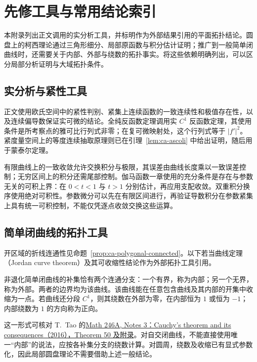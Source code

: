 \setcounter{chapter}{0} %
\chapter{先修工具与常用结论索引}
\label{chap:ca-prerequisites}

本附录列出正文调用的实分析工具，并标明作为外部结果引用的平面拓扑结论。圆盘上的柯西理论通过三角形细分、局部原函数与积分估计证明；推广到一般简单闭曲线时，还需要关于内部、外部与绕数的拓扑事实。将这些依赖明确列出，可以区分局部分析证明与大域拓扑条件。

\section{实分析与紧性工具}

正文使用欧氏空间中的紧性判别、紧集上连续函数的一致连续性和极值存在性，以及连续偏导数保证实可微的结论。全纯反函数定理调用实 $C^1$ 反函数定理，其使用条件是所考察点的雅可比行列式非零；在复可微映射处，这个行列式等于 $|f'|^2$。紧度量空间上的等度连续抽取原理则已在引理~\ref{lem:ca-ascoli} 中给出证明，随后用于蒙泰尔定理。

有限曲线上的一致收敛允许交换积分与极限，其误差由曲线长度乘以一致误差控制；无穷区间上的积分还需尾部控制。伽马函数一章使用的充分条件是存在与参数无关的可积上界：在 $0<t<1$ 与 $t>1$ 分别估计，再应用支配收敛。双重积分换序使用绝对可积性。参数微分可以先在有限区间进行，再验证导数积分在参数紧集上具有统一可积控制，不能仅凭逐点收敛交换这些运算。

\section{简单闭曲线的拓扑工具}
\label{sec:ca-jordan-tool}

开区域的折线连通性见命题~\ref{prop:ca-polygonal-connected}。以下若当曲线定理（Jordan curve theorem）及其可收缩性结论作为外部拓扑工具引用。

\begin{theorem}[简单闭曲线的内外区域]
\label{thm:ca-jordan-curve}
非退化简单闭曲线的补集恰有两个连通分支：一个有界，称为内部；另一个无界，称为外部。两者的边界均为该曲线。该曲线能在任意包含曲线及其内部的开集中收缩为一点。若曲线还分段 $C^1$，则其绕数在外部为零，在内部恒为 $1$ 或恒为 $-1$；内部绕数为 $1$ 的方向称为正向。
\end{theorem}

这一形式可核对 T.~Tao 的\href{https://terrytao.wordpress.com/2016/10/02/math-246a-notes-3-cauchys-theorem-and-its-consequences/}{Math 246A, Notes 3：Cauchy's theorem and its consequences（2016），Theorem 50 及附录}。对自交闭曲线，不能直接使用唯一“内部”的说法，应按各补集分支的绕数计算。对圆周，绕数及收缩已有显式参数化，因此局部圆盘理论不需要借助上述一般结论。

